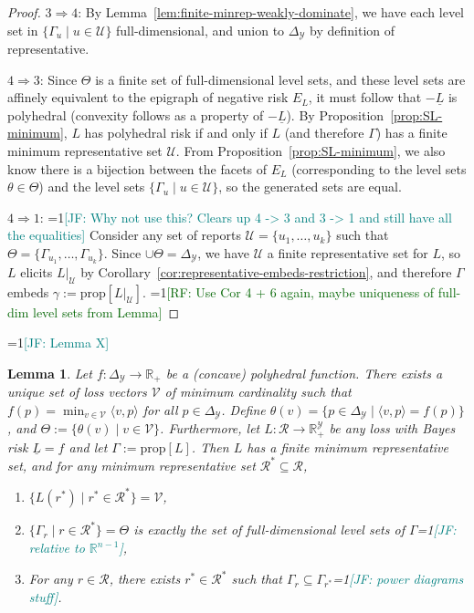 \documentclass[11pt]{article}
\newcommand{\Comments}{1}
\newcommand{\mynote}[2]{\ifnum\Comments=1\textcolor{#1}{#2}\fi}
\newcommand{\raf}[1]{\mynote{darkgreen}{[RF: #1]}}
\newcommand{\jessie}[1]{\mynote{teal}{[JF: #1]}}
\newcommand{\reals}{\mathbb{R}}
\newcommand{\prop}[1]{\mathrm{prop}[#1]}
\newcommand{\simplex}{\Delta_\Y}
\newcommand{\R}{\mathcal{R}}
\newcommand{\U}{\mathcal{U}}
\newcommand{\V}{\mathcal{V}}
\newcommand{\Y}{\mathcal{Y}}
\newcommand{\risk}[1]{\underline{#1}}
\newcommand{\inprod}[2]{\langle #1, #2 \rangle}%
\newtheorem{lemma}{Lemma}
\begin{document}
\begin{proof}
$3 \Rightarrow 4$:
By Lemma~\ref{lem:finite-minrep-weakly-dominate}, we have each level set in $\{\Gamma_u \mid u \in \U\}$ full-dimensional, and union to $\simplex$ by definition of representative.

$4 \Rightarrow 3$:
Since $\Theta$ is a finite set of full-dimensional level sets, and these level sets are affinely equivalent to the epigraph of negative risk $E_L$, it must follow that $-\risk L$ is polyhedral (convexity follows as a property of $-\risk L$). 
By Proposition~\ref{prop:SL-minimum}, $L$ has polyhedral risk if and only if $L$ (and therefore $\Gamma$) has a finite minimum representative set $\U$.
From Proposition~\ref{prop:SL-minimum}, we also know there is a bijection between the facets of $E_L$ (corresponding to the level sets $\theta \in \Theta$) and the level sets $\{\Gamma_u \mid u \in \U\}$, so the generated sets are equal.

$4 \Rightarrow 1$: \jessie{Why not use this? Clears up 4 -> 3 and 3 -> 1 and still have all the equalities}
Consider any set of reports $\U = \{u_1, \ldots, u_k\}$ such that $\Theta = \{\Gamma_{u_1}, \ldots, \Gamma_{u_k}\}$.
Since $\cup \Theta = \simplex$, we have $\U$ a finite representative set for $L$, so $L$ elicits $L|_\U$ by Corollary~\ref{cor:representative-embeds-restriction}, and therefore $\Gamma$ embeds $\gamma := \prop{L|_\U}$. 
\raf{Use Cor 4 + 6 again, maybe uniqueness of full-dim level sets from Lemma}

\end{proof}

\jessie{Lemma X}
\begin{lemma}
  Let $f: \simplex \to \reals_+$ be a (concave) polyhedral function.
  There exists a unique set of loss vectors $\V$ of minimum cardinality such that $f(p) = \min_{v \in \V} \inprod{v}{p}$ for all $p\in\simplex$.
  Define $\theta(v) = \{p \in \simplex \mid \inprod{v}{p} = f(p)\}$, and $\Theta := \{\theta(v) \mid v \in \V\}$.
  Furthermore, let $L: \R \to \reals^\Y_+$ be any loss with Bayes risk $\risk L=f$ and let $\Gamma := \prop{L}$.
  Then $L$ has a finite minimum representative set, and for any minimum representative set $\R^* \subseteq \R$,
  \begin{enumerate}
  \item $\{L(r^*) \mid r^* \in \R^*\} = \V$,
  \item $\{\Gamma_r \mid r \in \R^*\} = \Theta$ is exactly the set of full-dimensional level sets of $\Gamma$\jessie{relative to $\reals^{n-1}$},
  \item For any $r \in \R$, there exists $r^* \in \R^*$ such that $\Gamma_r \subseteq \Gamma_{r^*}$\jessie{power diagrams stuff}.
  \end{enumerate}
\end{lemma}
\end{document}
